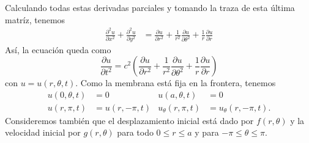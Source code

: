 \documentclass[11pt,letterpaper]{report}
\newcommand\<{\langle}
\renewcommand\>{\rangle}
\begin{document}
Calculando todas estas derivadas parciales
y tomando la traza de esta última matríz, tenemos
\begin{align*}
  \frac{\partial^{2} u}{\partial x^{2}}
  +
  \frac{\partial^{2} u}{\partial y^{2}}
  &=
  \frac{\partial u}{\partial r^{2}}
  +
  \frac{1}{r^{2}}\frac{\partial u}{\partial \theta^{2}}
  +
  \frac{1}{r}\frac{\partial u}{\partial r}
\end{align*}
Así, la ecuación queda como
\[
  \frac{\partial u}{\partial t^{2}}
  =c^{2}
  \left(
    \frac{\partial u}{\partial r^{2}}
    +
    \frac{1}{r^{2}}\frac{\partial u}{\partial \theta^{2}}
    +
    \frac{1}{r}\frac{\partial u}{\partial r}
  \right)
\]
con $u=u(r,\theta,t)$.
Como la membrana está fija en la frontera, tenemos
\begin{align*}
  u(0,\theta,t)&= 0 & u(a,\theta,t)&= 0 \\
  u(r,\pi,t)&=u(r,-\pi,t) & u_\theta(r,\pi,t)&=u_\theta(r,-\pi,t).
\end{align*}
Consideremos también que el desplazamiento inicial está dado por
$f(r,\theta)$ y la velocidad inicial por $g(r,\theta)$ para todo
$0\leq r\leq a$ y para $-\pi\leq\theta\leq\pi$.
\end{document}

